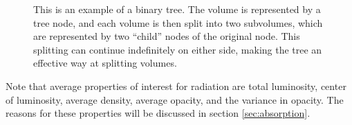 \begin{figure}
\begin{subfigure}[b]{0.45\textwidth}
                \label{fig:memorytree}
        \end{subfigure}
        \caption[Example of trees]{This is an example of a binary tree. The volume is represented by a tree node, and each volume is then split into two subvolumes, which are represented by two ``child'' nodes of the original node. This splitting can continue indefinitely on either side, making the tree an effective way at splitting volumes.}
        \label{fig:trees}
\end{figure}

Note that average properties of interest for radiation are total luminosity, center of luminosity, average density, average opacity, and the variance in opacity. The reasons for these properties will be discussed in section \ref{sec:absorption}.



